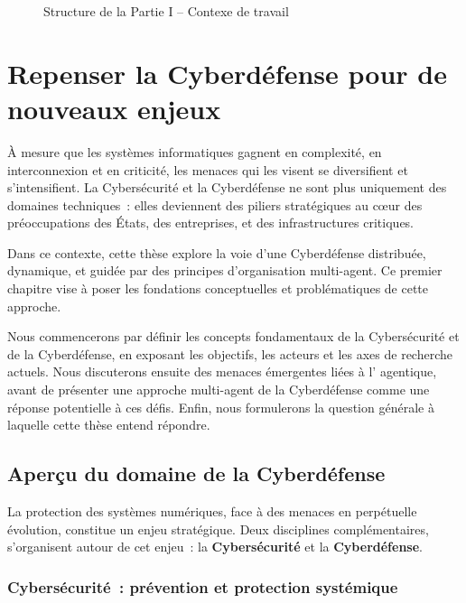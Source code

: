 \begin{figure}[h!]
    \centering
    \resizebox{\textwidth}{!}{%
        
    }
    \caption{Structure de la Partie I -- Contexe de travail}
    \label{fig:organisation_manuscrit_partie_1}
\end{figure}

\clearpage
\thispagestyle{empty}
\null
\newpage

\chapter{Repenser la Cyberdéfense pour de nouveaux enjeux}

\noindent
À mesure que les systèmes informatiques gagnent en complexité, en interconnexion et en criticité, les menaces qui les visent se diversifient et s'intensifient. La Cybersécurité et la Cyberdéfense ne sont plus uniquement des domaines techniques~: elles deviennent des piliers stratégiques au cœur des préoccupations des États, des entreprises, et des infrastructures critiques.

Dans ce contexte, cette thèse explore la voie d'une Cyberdéfense distribuée, dynamique, et guidée par des principes d'organisation multi-agent. Ce premier chapitre vise à poser les fondations conceptuelles et problématiques de cette approche.

Nous commencerons par définir les concepts fondamentaux de la Cybersécurité et de la Cyberdéfense, en exposant les objectifs, les acteurs et les axes de recherche actuels. Nous discuterons ensuite des menaces émergentes liées à l' agentique, avant de présenter une approche multi-agent de la Cyberdéfense comme une réponse potentielle à ces défis. Enfin, nous formulerons la question générale à laquelle cette thèse entend répondre.

\section{Aperçu du domaine de la Cyberdéfense}\label{sec:cyberdef-panorama}

La protection des systèmes numériques, face à des menaces en perpétuelle évolution, constitue un enjeu stratégique. Deux disciplines complémentaires, s'organisent autour de cet enjeu~: la \textbf{Cybersécurité} et la \textbf{Cyberdéfense}.

\subsection*{Cybersécurité~: prévention et protection systémique}

